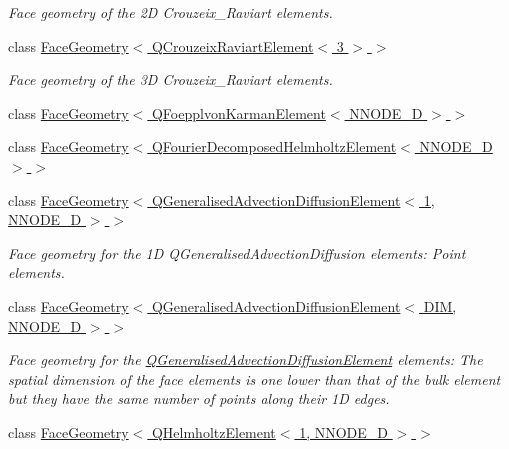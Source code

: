 \begin{DoxyCompactItemize}
\begin{DoxyCompactList}\small\item\em Face geometry of the 2D Crouzeix\+\_\+\+Raviart elements. \end{DoxyCompactList}\item 
class \hyperlink{classoomph_1_1FaceGeometry_3_01QCrouzeixRaviartElement_3_013_01_4_01_4}{Face\+Geometry$<$ Q\+Crouzeix\+Raviart\+Element$<$ 3 $>$ $>$}
\begin{DoxyCompactList}\small\item\em Face geometry of the 3D Crouzeix\+\_\+\+Raviart elements. \end{DoxyCompactList}\item 
class \hyperlink{classoomph_1_1FaceGeometry_3_01QFoepplvonKarmanElement_3_01NNODE__1D_01_4_01_4}{Face\+Geometry$<$ Q\+Foepplvon\+Karman\+Element$<$ N\+N\+O\+D\+E\+\_\+D $>$ $>$}
\item 
class \hyperlink{classoomph_1_1FaceGeometry_3_01QFourierDecomposedHelmholtzElement_3_01NNODE__1D_01_4_01_4}{Face\+Geometry$<$ Q\+Fourier\+Decomposed\+Helmholtz\+Element$<$ N\+N\+O\+D\+E\+\_\+D $>$ $>$}
\item 
class \hyperlink{classoomph_1_1FaceGeometry_3_01QGeneralisedAdvectionDiffusionElement_3_011_00_01NNODE__1D_01_4_01_4}{Face\+Geometry$<$ Q\+Generalised\+Advection\+Diffusion\+Element$<$ 1, N\+N\+O\+D\+E\+\_\+D $>$ $>$}
\begin{DoxyCompactList}\small\item\em Face geometry for the 1D Q\+Generalised\+Advection\+Diffusion elements\+: Point elements. \end{DoxyCompactList}\item 
class \hyperlink{classoomph_1_1FaceGeometry_3_01QGeneralisedAdvectionDiffusionElement_3_01DIM_00_01NNODE__1D_01_4_01_4}{Face\+Geometry$<$ Q\+Generalised\+Advection\+Diffusion\+Element$<$ D\+I\+M, N\+N\+O\+D\+E\+\_\+D $>$ $>$}
\begin{DoxyCompactList}\small\item\em Face geometry for the \hyperlink{classoomph_1_1QGeneralisedAdvectionDiffusionElement}{Q\+Generalised\+Advection\+Diffusion\+Element} elements\+: The spatial dimension of the face elements is one lower than that of the bulk element but they have the same number of points along their 1D edges. \end{DoxyCompactList}\item 
class \hyperlink{classoomph_1_1FaceGeometry_3_01QHelmholtzElement_3_011_00_01NNODE__1D_01_4_01_4}{Face\+Geometry$<$ Q\+Helmholtz\+Element$<$ 1, N\+N\+O\+D\+E\+\_\+D $>$ $>$}

\end{DoxyCompactItemize}
